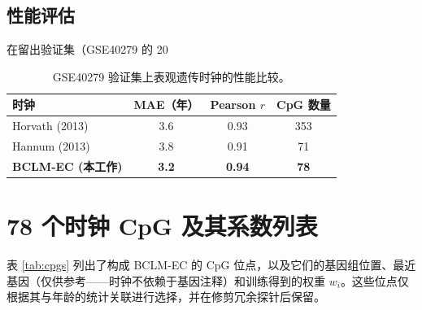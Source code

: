 \documentclass[12pt,a4paper,fontset=fandol]{ctexart}
\begin{document}
	\subsection{性能评估}
	在留出验证集（GSE40279 的 20%
	
	\begin{table}[H]
		\centering
		\caption{GSE40279 验证集上表观遗传时钟的性能比较。}
		\label{tab:clock-comparison}
		\begin{tabular}{lccc}
			\toprule
			\textbf{时钟} & \textbf{MAE（年）} & \textbf{Pearson \(r\)} & \textbf{CpG 数量} \\
			\midrule
			Horvath (2013) & 3.6 & 0.93 & 353 \\
			Hannum (2013)\footnotemark & 3.8 & 0.91 & 71 \\
			\textbf{BCLM‑EC (本工作)} & \textbf{3.2} & \textbf{0.94} & \textbf{78} \\
			\bottomrule
		\end{tabular}
	\end{table}
	
	\section{78 个时钟 CpG 及其系数列表}
	\label{sec:cpgs}
	表 \ref{tab:cpgs} 列出了构成 BCLM‑EC 的 CpG 位点，以及它们的基因组位置、最近基因（仅供参考——时钟不依赖于基因注释）和训练得到的权重 \(w_i\)。这些位点仅根据其与年龄的统计关联进行选择，并在修剪冗余探针后保留。
	
\end{document}
